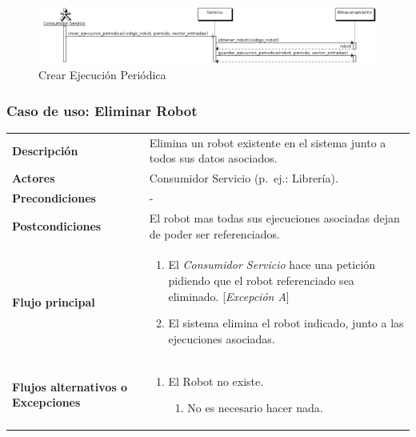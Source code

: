 \begin{figure}[bp!]
  \includegraphics[width=1\textwidth]{chapters/technical-manual/diagrams/sequence/crear_ejecucion_periodica.png}
\caption{Crear Ejecución Periódica}
\end{figure}
\clearpage

\subsubsection{\large{Caso de uso: Eliminar Robot}}

\begin{tabular}[h]{ p{ } p{ }}
\textbf{Descripción} & Elimina un robot existente en el sistema junto
a todos sus datos asociados. \\[3mm]

\textbf{Actores} & Consumidor Servicio (p.~ej.: Librería).\\[3mm]

\textbf{Precondiciones} & - \\[3mm]

\textbf{Postcondiciones} & El robot mas todas sus ejecuciones
asociadas dejan de poder ser referenciados. \\[3mm]

\textbf{Flujo principal} & \begin{enumerate}[leftmargin=1em,topsep=0pt, partopsep=0pt]
  \item El \emph{Consumidor Servicio} hace una petición pidiendo que
    el robot referenciado sea eliminado. [\emph{Excepción A}]
  \item El sistema elimina el robot indicado, junto a las ejecuciones
    asociadas.
\end{enumerate}\\[3mm]

\textbf{Flujos alternativos o Excepciones} &
\begin{enumerate}[label=\Alph*:,leftmargin=1em,topsep=0pt, partopsep=0pt]
\item El Robot no existe.
  \begin{enumerate}[label=\arabic*.,topsep=0pt, partopsep=0pt]
    \item No es necesario hacer nada.
  \end{enumerate}
\end{enumerate}\\[3mm]
\end{tabular}

